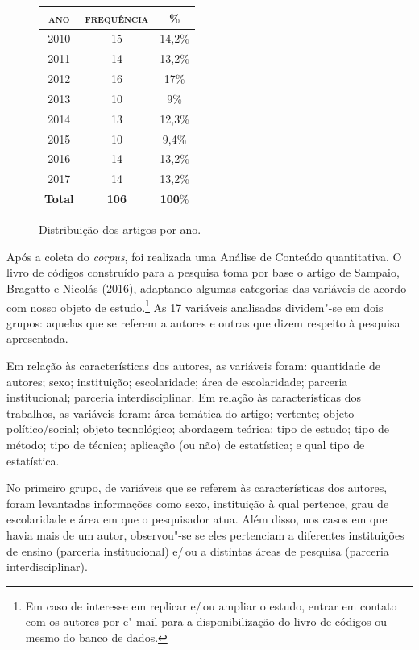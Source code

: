 \begin{figure}[!ht]
\begin{center}
\begin{tabular}{|c|c|c|}
\hline
\textsc{ano} & \textsc{frequência} & \textsc{\%} \\ \hline\hline
2010 & 15 & 14,2\% \\ \hline
2011 & 14 & 13,2\% \\ \hline
2012 & 16 & 17\% \\ \hline
2013 & 10 & 9\% \\ \hline
2014 & 13 & 12,3\% \\ \hline
2015 & 10 & 9,4\% \\ \hline
2016 & 14 & 13,2\% \\ \hline
2017 & 14 & 13,2\% \\ \hline
\textbf{Total} & \textbf{106} & \textbf{100}\% \\ \hline
\end{tabular}
\end{center}
\caption{Distribuição dos artigos por ano.\footnotemark}

\end{figure}


Após a coleta do \textit{corpus}, foi realizada uma Análise de Conteúdo
quantitativa. O livro de códigos construído para a pesquisa toma por
base o artigo de Sampaio, Bragatto e Nicolás (2016), adaptando algumas
categorias das variáveis de acordo com nosso objeto de estudo.\footnote{Em
  caso de interesse em replicar e/\,ou ampliar o estudo, entrar em contato
  com os autores por e"-mail para a disponibilização do livro de códigos
  ou mesmo do banco de dados.} As 17 variáveis analisadas
dividem"-se em dois grupos: aquelas que se referem a autores e outras
que dizem respeito à pesquisa apresentada.

Em relação às características dos autores, as variáveis foram: quantidade de autores; sexo; instituição; escolaridade; área de escolaridade; parceria institucional; parceria interdisciplinar. 
Em relação às características dos trabalhos, as variáveis foram: área temática do artigo; vertente; objeto político/social; objeto tecnológico; abordagem teórica; tipo de estudo; tipo de método; tipo de técnica; aplicação (ou não) de estatística; e qual tipo de estatística.

No primeiro grupo, de variáveis que se referem às características dos
autores, foram levantadas informações como sexo, instituição à qual
pertence, grau de escolaridade e área em que o pesquisador atua.
Além disso, nos casos em que havia mais de um autor, observou"-se se
eles pertenciam a diferentes instituições de ensino (parceria
institucional) e/\,ou a distintas áreas de pesquisa (parceria
interdisciplinar).

